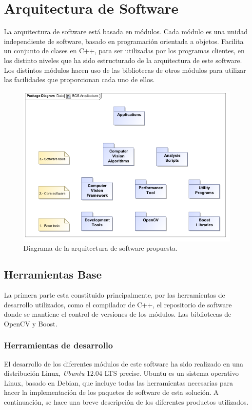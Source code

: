 \section{Arquitectura de Software}

La arquitectura de software está basada en módulos. Cada módulo es una unidad independiente de software, basado en programación orientada a objetos. Facilita un conjunto de clases en C++, para ser utilizadas por los programas clientes, en los distinto niveles que ha sido estructurado de la arquitectura de este software. Los distintos módulos hacen uso de las bibliotecas de otros módulos para utilizar las facilidades que proporcionan cada uno de ellos.  

\begin{figure}[h!]
\centering
\includegraphics[scale=0.7]{img/BGS_Arquitecture}
\caption[Arquitectura modular de software]{Diagrama de la arquitectura de software propuesta.}
\label{fig:arq_software}
\end{figure}
 

\subsection{Herramientas Base}

La primera parte esta constituido principalmente, por las herramientas de desarrollo utilizados, como el compilador de C++, el repositorio de software donde se mantiene el control de versiones de los módulos. Las bibliotecas de OpenCV y Boost.

\subsubsection{Herramientas de desarrollo}
El desarrollo de los diferentes módulos de este software ha sido realizado en una distribución Linux, \textit{Ubuntu} 12.04 LTS precise. Ubuntu es un sistema operativo Linux, basado en Debian, que incluye todas las herramientas necesarias para hacer la implementación de los paquetes de software de esta solución. A continuación, se hace una breve descripción de los diferentes productos utilizados.

